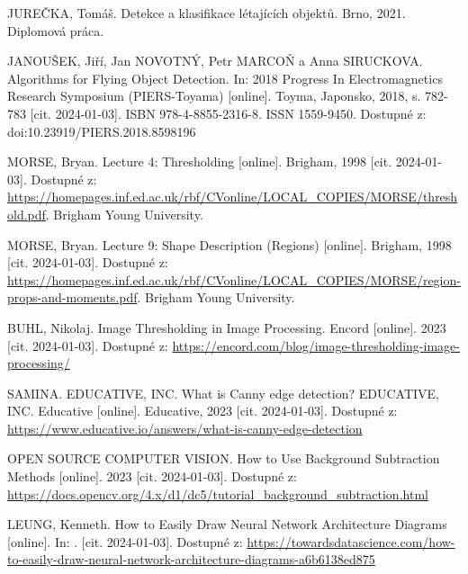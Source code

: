 

\begin{thebibliography}{99}
	
		JUREČKA, Tomáš. Detekce a klasifikace létajících objektů. Brno, 2021. Diplomová práca.

		JANOUŠEK, Jiří, Jan NOVOTNÝ, Petr MARCOŇ a Anna SIRUCKOVA. Algorithms for Flying Object Detection. In: 2018 Progress In Electromagnetics Research Symposium (PIERS-Toyama) [online]. Toyma, Japonsko, 2018, s. 782-783 [cit. 2024-01-03]. ISBN 978-4-8855-2316-8. ISSN 1559-9450. Dostupné z: doi:10.23919/PIERS.2018.8598196

		MORSE, Bryan. Lecture 4: Thresholding [online]. Brigham, 1998 [cit. 2024-01-03]. Dostupné z: \url{https://homepages.inf.ed.ac.uk/rbf/CVonline/LOCAL_COPIES/MORSE/threshold.pdf}. Brigham Young University.

		MORSE, Bryan. Lecture 9: Shape Description (Regions) [online]. Brigham, 1998 [cit. 2024-01-03]. Dostupné z: \url{https://homepages.inf.ed.ac.uk/rbf/CVonline/LOCAL_COPIES/MORSE/region-props-and-moments.pdf}. Brigham Young University.

		BUHL, Nikolaj. Image Thresholding in Image Processing. Encord [online]. 2023 [cit. 2024-01-03]. Dostupné z: \url{https://encord.com/blog/image-thresholding-image-processing/}

		SAMINA. EDUCATIVE, INC. What is Canny edge detection? EDUCATIVE, INC. Educative [online]. Educative, 2023 [cit. 2024-01-03]. Dostupné z: \url{https://www.educative.io/answers/what-is-canny-edge-detection}

		OPEN SOURCE COMPUTER VISION. How to Use Background Subtraction Methods [online]. 2023 [cit. 2024-01-03]. Dostupné z: \url{https://docs.opencv.org/4.x/d1/dc5/tutorial_background_subtraction.html}

		LEUNG, Kenneth. How to Easily Draw Neural Network Architecture Diagrams [online]. In: . [cit. 2024-01-03]. Dostupné z: \url{https://towardsdatascience.com/how-to-easily-draw-neural-network-architecture-diagrams-a6b6138ed875}


\end{thebibliography}
